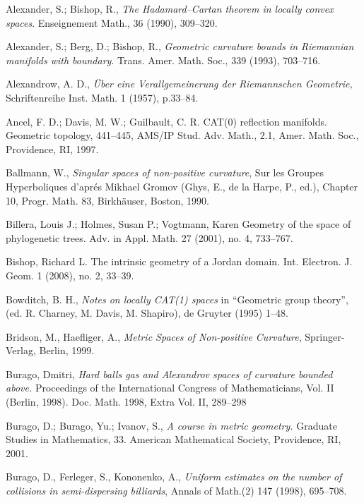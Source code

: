 \begin{thebibliography}{52}

Alexander, S.; Bishop, R., \textit{The Hadamard--Cartan theorem in locally convex spaces}. Enseignement Math., 36 (1990), 309--320.

 Alexander, S.; Berg, D.; Bishop, R., \textit{Geometric curvature bounds in Riemannian manifolds with
boundary}. Trans. Amer. Math. Soc., 339 (1993), 703--716.

 Alexandrow, A. D.,  \textit{\"Uber eine Verallgemeinerung der Riemannschen Geometrie,}
Schriftenreihe Inst. Math. 1 (1957), p.33--84.

 Ancel, F. D.; Davis, M. W.; Guilbault, C. R.
CAT(0) reflection manifolds. Geometric topology, 441--445,
AMS/IP Stud. Adv. Math., 2.1, Amer. Math. Soc., Providence, RI, 1997.

Ballmann, W., \textit{Singular spaces of non-positive curvature}, Sur les Groupes Hyperboliques d'apr\'{e}s Mikhael Gromov (Ghys, E., de la Harpe, P., ed.), Chapter 10, Progr. Math. 83, Birkh\"auser, Boston, 1990. 

 Billera, Louis J.; Holmes, Susan P.; Vogtmann, Karen Geometry of the space of phylogenetic trees. Adv. in Appl. Math. 27 (2001), no. 4, 733--767.

Bishop, Richard L. The intrinsic geometry of a Jordan domain. Int. Electron. J. Geom. 1 (2008), no. 2, 33--39.

 Bowditch, B. H.,
\textit{Notes on locally CAT(1) spaces} 
in ``Geometric group theory'', (ed. R. Charney, M. Davis, M. Shapiro), de Gruyter (1995) 1--48.

Bridson, M., Haefliger, A.,
\textit{Metric Spaces of Non-positive Curvature},
Springer-Verlag, Berlin, 1999.

 Burago, Dmitri, \textit{Hard balls gas and Alexandrov spaces of curvature bounded above.} Proceedings of the International Congress of Mathematicians, Vol. II (Berlin, 1998). Doc. Math. 1998, Extra Vol. II, 289–298

 Burago, D.; Burago, Yu.; Ivanov, S., \textit{A course in metric geometry.} Graduate Studies in Mathematics, 33. American Mathematical Society, Providence, RI, 2001. 

Burago, D., Ferleger, S., Kononenko, A.,
\textit{Uniform estimates on the number of collisions in semi-dispersing billiards},
Annals of Math.(2) 147 (1998), 695--708.


\end{thebibliography}
